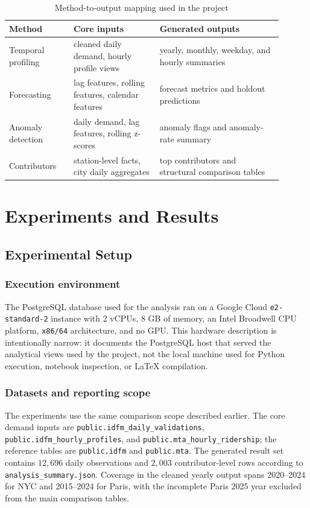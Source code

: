 \documentclass[10pt,twocolumn,a4paper]{article}
\begin{document}
\begin{table}[t]
\centering
\scriptsize
\caption{Method-to-output mapping used in the project}
{\setlength{\tabcolsep}{3pt}
\begin{tabular}{@{}L{0.21\linewidth}L{0.29\linewidth}L{0.40\linewidth}@{}}
\toprule
Method & Core inputs & Generated outputs \\
\midrule
Temporal profiling & cleaned daily demand, hourly profile views & yearly, monthly, weekday, and hourly summaries \\
Forecasting & lag features, rolling features, calendar features & forecast metrics and holdout predictions \\
Anomaly detection & daily demand, lag features, rolling z-scores & anomaly flags and anomaly-rate summary \\
Contributors & station-level facts, city daily aggregates & top contributors and structural comparison tables \\
\bottomrule
\end{tabular}
}
\end{table}


\section{Experiments and Results}

\subsection{Experimental Setup}

\subsubsection{Execution environment}

The PostgreSQL database used for the analysis ran on a Google
Cloud \texttt{e2-standard-2} instance with 2 vCPUs, 8 GB of memory, an Intel
Broadwell CPU platform, \texttt{x86/64} architecture, and no GPU. This
hardware description is intentionally narrow: it documents the PostgreSQL host
that served the analytical views used by the project, not the local machine
used for Python execution, notebook inspection, or LaTeX compilation.

\subsubsection{Datasets and reporting scope}

The experiments use the same comparison scope described earlier. The
core demand inputs are \nolinkurl{public.idfm_daily_validations},
\nolinkurl{public.idfm_hourly_profiles}, and
\nolinkurl{public.mta_hourly_ridership}; the reference tables are
\nolinkurl{public.idfm} and \nolinkurl{public.mta}. The generated result set
contains \(12{,}696\) daily observations and \(2{,}003\) contributor-level
rows according to \nolinkurl{analysis_summary.json}. Coverage in the cleaned yearly
output spans 2020--2024 for NYC and 2015--2024 for Paris, with the incomplete
Paris 2025 year excluded from the main comparison tables.
\end{document}
